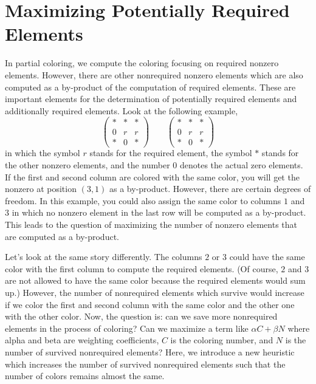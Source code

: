 \documentclass[12pt, twoside]{book}
\begin{document}
\section{Maximizing Potentially Required Elements}
\label{s.heuristic}
In partial coloring, we compute the coloring focusing on
required nonzero elements. However, there are other nonrequired nonzero elements 
which are also computed as a by-product of the computation of required elements. 
These are important elements for the determination of potentially required elements 
and additionally required elements. Look at the following example,
\begin{equation}
\left(\begin{array}{rrb}
* & * & *\\
0 & r & r \\
* & 0 & *
\end{array}\right)
\qquad
\left(\begin{array}{rbr}
* & * & *\\
0 & r & r \\
* & 0 & *
\end{array}\right)
\label{twocolorings}
\end{equation}
in which the symbol $r$ stands for the required element, the symbol \textit{$*$} stands for the other nonzero elements, and the number $0$ denotes the actual zero elements. If the first and second column are colored with the same color, you will get the nonzero at position $(3,1)$ as a by-product. However, there are certain degrees of freedom. In
this example, you could also assign the same color to columns $1$ and
$3$ in which no nonzero element in the last row will be computed
as a by-product. This leads to the question of maximizing the number of nonzero elements that are computed as a by-product.

Let's look at the same story differently. The columns $2$ or $3$ could have the same color with the first column to compute the
required elements. (Of course, $2$ and $3$ are not allowed to have the same color because the required elements would sum up.) However, the number of nonrequired elements which survive would increase if
we color the first and second column with the same color and the
other one with the other color. Now, the question is: can we save
more nonrequired elements in the process of coloring? Can we maximize a term like $\alpha C + \beta N$ where alpha and beta are
weighting coefficients, $C$ is the coloring number, and $N$ is the
number of survived nonrequired elements?
Here, we introduce a new heuristic which increases the number of survived nonrequired elements such that the number of colors remains almost the same.
\end{document}
